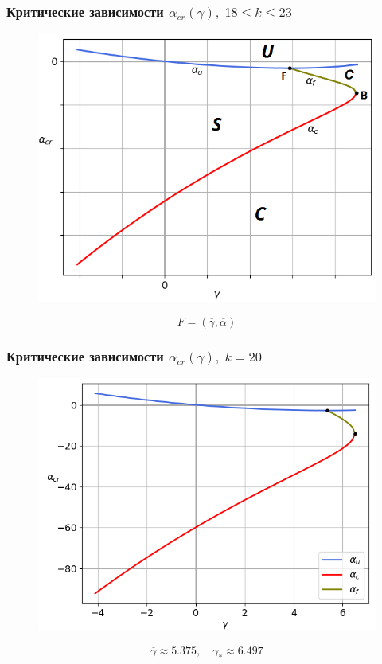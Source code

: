 \documentclass[fullscreen=true, unicode, bookmarks=false]{beamer}
\begin{document}
\begin{frame}
\frametitle{ Критические зависимости $ \alpha_{cr}(\gamma), \; 18 \leqslant k \leqslant 23 $ }

\begin{figure} 
\includegraphics[scale=0.55]{scheme1823.png}  
\end{figure}
$$ F = (\overline{\gamma}, \overline{\alpha}) $$

\end{frame}

\begin{frame}
\frametitle{ Критические зависимости $ \alpha_{cr}(\gamma), \; k = 20 $ }

\begin{figure} 
\includegraphics[scale=0.55]{alphas_039.png}  
\end{figure}
$$ \overline{\gamma} \approx 5.375, \quad \gamma_* \approx 6.497 $$

\end{frame}
\end{document}
